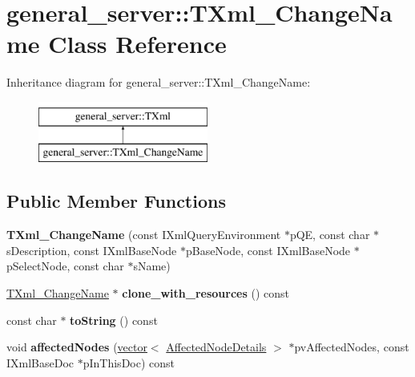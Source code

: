 \hypertarget{classgeneral__server_1_1TXml__ChangeName}{\section{general\-\_\-server\-:\-:\-T\-Xml\-\_\-\-Change\-Name \-Class \-Reference}
\label{classgeneral__server_1_1TXml__ChangeName}
}
\-Inheritance diagram for general\-\_\-server\-:\-:\-T\-Xml\-\_\-\-Change\-Name\-:\begin{figure}[H]
\begin{center}
\leavevmode
\includegraphics[height=2.000000cm]{classgeneral__server_1_1TXml__ChangeName}
\end{center}
\end{figure}
\subsection*{\-Public \-Member \-Functions}
\begin{DoxyCompactItemize}
\item 
\hypertarget{classgeneral__server_1_1TXml__ChangeName_a52882e9e05c1c1bca04caa3a2a6d0517}{{\bfseries \-T\-Xml\-\_\-\-Change\-Name} (const \-I\-Xml\-Query\-Environment $\ast$p\-Q\-E, const char $\ast$s\-Description, const \-I\-Xml\-Base\-Node $\ast$p\-Base\-Node, const \-I\-Xml\-Base\-Node $\ast$p\-Select\-Node, const char $\ast$s\-Name)}\label{classgeneral__server_1_1TXml__ChangeName_a52882e9e05c1c1bca04caa3a2a6d0517}

\item 
\hypertarget{classgeneral__server_1_1TXml__ChangeName_afc865b121f13b91bbf103b2f93b1e508}{\hyperlink{classgeneral__server_1_1TXml__ChangeName}{\-T\-Xml\-\_\-\-Change\-Name} $\ast$ {\bfseries clone\-\_\-with\-\_\-resources} () const }\label{classgeneral__server_1_1TXml__ChangeName_afc865b121f13b91bbf103b2f93b1e508}

\item 
\hypertarget{classgeneral__server_1_1TXml__ChangeName_a03b2f86cd27e2136de53f354c09c1136}{const char $\ast$ {\bfseries to\-String} () const }\label{classgeneral__server_1_1TXml__ChangeName_a03b2f86cd27e2136de53f354c09c1136}

\item 
\hypertarget{classgeneral__server_1_1TXml__ChangeName_a70b3233568ec85203f0af5d4a9bddce0}{void {\bfseries affected\-Nodes} (\hyperlink{classvector}{vector}$<$ \hyperlink{structgeneral__server_1_1TXml_1_1AffectedNodeDetails}{\-Affected\-Node\-Details} $>$ $\ast$pv\-Affected\-Nodes, const \-I\-Xml\-Base\-Doc $\ast$p\-In\-This\-Doc) const }\label{classgeneral__server_1_1TXml__ChangeName_a70b3233568ec85203f0af5d4a9bddce0}

\end{DoxyCompactItemize}
